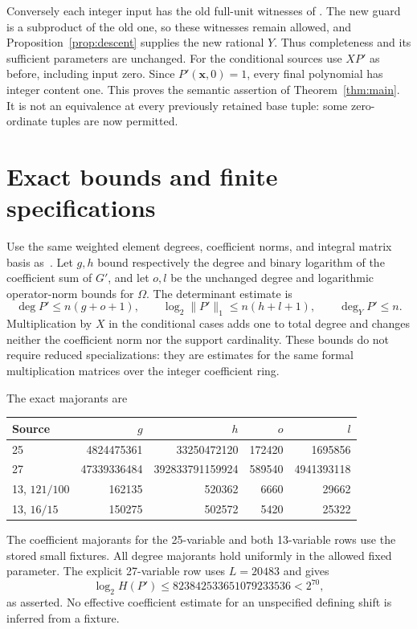 \documentclass[11pt,a4paper]{article}
\begin{document}
Conversely each integer input has the old full-unit witnesses of
\cite{Unit}. The new guard is a subproduct of the old one, so these
witnesses remain allowed, and Proposition~\ref{prop:descent} supplies
the new rational $Y$. Thus completeness and its sufficient parameters
are unchanged. For the conditional sources use $XP'$ as before,
including input zero. Since $P'(\boldsymbol x,0)=1$, every final
polynomial has integer content one. This proves the semantic assertion
of Theorem~\ref{thm:main}. It is not an equivalence at every previously
retained base tuple: some zero-ordinate tuples are now permitted.

\section{Exact bounds and finite specifications}
Use the same weighted element degrees, coefficient norms, and integral
matrix basis as~\cite{Subalgebra}. Let $g,h$ bound respectively the
degree and binary logarithm of the coefficient sum of $G'$, and let
$o,l$ be the unchanged degree and logarithmic operator-norm bounds for
$\Omega$. The determinant estimate is
\begin{equation}\label{eq:bounds}
 \deg P'\le n(g+o+1),\qquad
 \log_2\|P'\|_1\le n(h+l+1),\qquad \deg_Y P'\le n.
\end{equation}
Multiplication by $X$ in the conditional cases adds one to total degree
and changes neither the coefficient norm nor the support cardinality.
These bounds do not require reduced specializations: they are estimates
for the same formal multiplication matrices over the integer coefficient
ring.

The exact majorants are
\begin{center}\scriptsize
\begin{tabular}{lrrrr}\toprule
Source & $g$ & $h$ & $o$ & $l$\\\midrule
25 &4824475361&33250472120&172420&1695856\\
27 &47339336484&392833791159924&589540&4941393118\\
13, $121/100$ &162135&520362&6660&29662\\
13, $16/15$ &150275&502572&5420&25322\\\bottomrule
\end{tabular}
\end{center}
The coefficient majorants for the 25-variable and both 13-variable rows
use the stored small fixtures. All degree majorants hold uniformly in the
allowed fixed parameter. The explicit 27-variable row uses $L=20483$ and gives
\[
 \log_2 H(P')\le823842533651079233536<2^{70},
\]
as asserted. No effective coefficient estimate for an unspecified
defining shift is inferred from a fixture.
\end{document}
